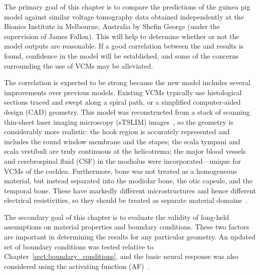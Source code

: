 

The primary goal of this chapter is to compare the \insilico{} predictions of
the guinea pig model against similar \invivo{} voltage tomography data obtained
independently at the Bionics Institute in Melbourne, Australia by Shefin George
(under the supervision of James Fallon). This will help to determine whether or
not the model outputs are reasonable. If a good correlation between the
\insilico{} and \invivo{} results is found, confidence in the model will be
established, and some of the concerns surrounding the use of VCMs may be
alleviated.

The correlation is expected to be strong because the new model includes several
improvements over previous models. Existing VCMs typically use histological
sections traced and swept along a spiral path, or a simplified computer-aided
design (CAD) geometry. This model was reconstructed from a stack of scanning
thin-sheet laser imaging microscopy (sTSLIM) images~\cite{santi2011}, so the
geometry is considerably more realistic: the hook region is accurately
represented and includes the round window membrane and the stapes; the scala
tympani and scala vestibuli are truly continuous at the helicotrema; the major
blood vessels and cerebrospinal fluid (CSF) in the modiolus were
incorporated---unique for VCMs of the cochlea. Furthermore, bone was not treated
as a homogeneous material, but instead separated into the modiolar bone, the
otic capsule, and the temporal bone. These have markedly different
microstructures and hence different electrical resistivities, so they should be
treated as separate material
domains~\cite{spelman1987,suesserman1992,micco2006,wong2013mb}.

The secondary goal of this chapter is to evaluate the validity of long-held
assumptions on material properties and boundary conditions. These two factors
are important in determining the \insilico{} results for any particular
geometry. An updated set of boundary conditions was tested relative to
Chapter~\ref{sect:boundary_conditions}, and the basic neural response was also
considered using the activating function (AF)~\cite{rattay1986}.

